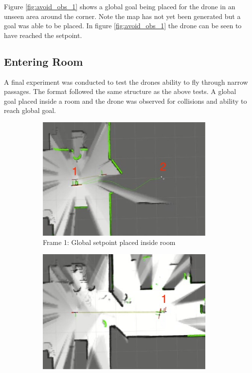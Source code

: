\documentclass[capstone_report.tex]{subfiles}
\begin{document}
Figure \ref{fig:avoid_obs_1} shows a global goal being placed for the drone in an unseen area around the corner.  Note the map has not yet been generated but a goal was able to be placed.  In figure \ref{fig:avoid_obs_1} the drone can be seen to have reached the setpoint.

\subsection{Entering Room}

A final experiment was conducted to test the drones ability to fly through narrow passages.  The format followed the same structure as the above tests.  A global goal placed inside a room and the drone was observed for collisions and ability to reach global goal.

\begin{figure}[H]
    \centering
    \begin{subfigure}{0.5\textwidth}
        \centering
        \includegraphics[width=0.97\textwidth]{./imgs/entering_room/an_frame_1.jpg}
        \caption{Frame 1: Global setpoint placed inside room}
        \label{fig:enter_room_1}
    \end{subfigure}%
    \begin{subfigure}{0.5\textwidth}
        \centering
        \includegraphics[width=0.97\textwidth]{./imgs/entering_room/an_frame_2.jpg}

\end{subfigure}
\end{figure}
\end{document}
